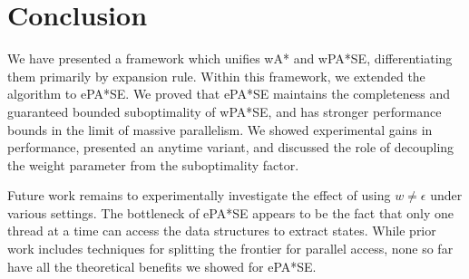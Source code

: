 \documentclass[letterpaper]{article}
\begin{document}
\section{Conclusion}

We have presented a framework which unifies wA* and wPA*SE, differentiating them primarily by expansion rule. Within this framework, we extended the algorithm to ePA*SE. We proved that ePA*SE maintains the completeness and guaranteed bounded suboptimality of wPA*SE, and has stronger performance bounds in the limit of massive parallelism. We showed experimental gains in performance, presented an anytime variant, and discussed the role of decoupling the weight parameter from the suboptimality factor.

Future work remains to experimentally investigate the effect of using $w \ne \epsilon$ under various settings. The bottleneck of ePA*SE appears to be the fact that only one thread at a time can access the data structures to extract states. While prior work includes techniques for splitting the frontier for parallel access, none so far have all the theoretical benefits we showed for ePA*SE.



\end{document}
